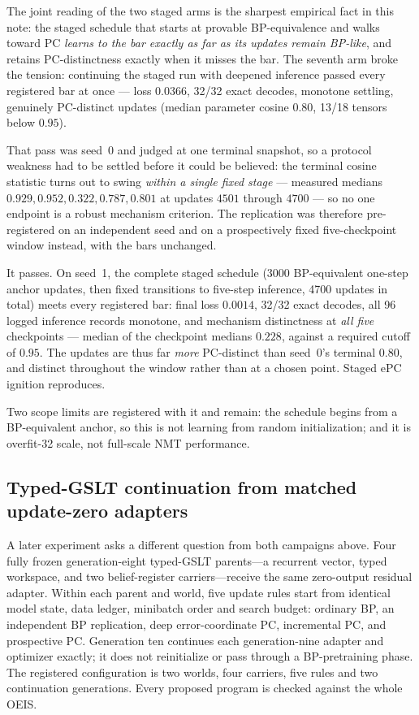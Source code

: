 \documentclass[11pt]{article}
\begin{document}
The joint reading of the two staged arms is the sharpest empirical fact in this note: the
staged schedule that starts at provable BP-equivalence and walks toward PC \emph{learns
to the bar exactly as far as its updates remain BP-like}, and retains PC-distinctness
exactly when it misses the bar. The seventh arm broke the tension: continuing the staged
run with deepened inference passed every registered bar at once --- loss $0.0366$, 32/32
exact decodes, monotone settling, genuinely PC-distinct updates (median parameter cosine
$0.80$, 13/18 tensors below $0.95$).

That pass was seed~0 and judged at one terminal snapshot, so a protocol weakness had to be
settled before it could be believed: the terminal cosine statistic turns out to swing
\emph{within a single fixed stage} --- measured medians $0.929, 0.952, 0.322, 0.787,
0.801$ at updates $4501$ through $4700$ --- so no one endpoint is a robust mechanism
criterion. The replication was therefore pre-registered on an independent seed and on a
prospectively fixed five-checkpoint window instead, with the bars unchanged.

It passes. On seed~1, the complete staged schedule (3000 BP-equivalent one-step anchor
updates, then fixed transitions to five-step inference, 4700 updates in total) meets every
registered bar: final loss $0.0014$, 32/32 exact decodes, all 96 logged inference records
monotone, and mechanism distinctness at \emph{all five} checkpoints --- median of the
checkpoint medians $0.228$, against a required cutoff of $0.95$. The updates are thus far
\emph{more} PC-distinct than seed~0's terminal $0.80$, and distinct throughout the window
rather than at a chosen point. Staged ePC ignition reproduces.

Two scope limits are registered with it and remain: the schedule begins from a
BP-equivalent anchor, so this is not learning from random initialization; and it is
overfit-32 scale, not full-scale NMT performance.

\subsection{Typed-GSLT continuation from matched update-zero adapters}
\label{sec:typed-factorial}

A later experiment asks a different question from both campaigns above. Four fully
frozen generation-eight typed-GSLT parents---a recurrent vector, typed workspace, and
two belief-register carriers---receive the same zero-output residual adapter. Within
each parent and world, five update rules start from identical model state, data ledger,
minibatch order and search budget: ordinary BP, an independent BP replication, deep
error-coordinate PC, incremental PC, and prospective PC. Generation ten continues each
generation-nine adapter and optimizer exactly; it does not reinitialize or pass through a
BP-pretraining phase. The registered configuration is two worlds, four carriers, five rules
and two continuation generations. Every proposed program is checked against the whole
OEIS.
\end{document}

